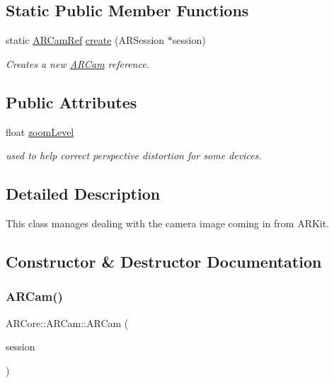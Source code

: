 \subsection*{Static Public Member Functions}
\begin{DoxyCompactItemize}
\item 
static \mbox{\hyperlink{namespace_a_r_core_a4ebe9e23907235fcf76bf65440fde0e0}{A\+R\+Cam\+Ref}} \mbox{\hyperlink{class_a_r_core_1_1_a_r_cam_ad4a6c0ebf786ea4e745cc8e95790681a}{create}} (A\+R\+Session $\ast$session)
\begin{DoxyCompactList}\small\item\em Creates a new \mbox{\hyperlink{class_a_r_core_1_1_a_r_cam}{A\+R\+Cam}} reference. \end{DoxyCompactList}\end{DoxyCompactItemize}
\subsection*{Public Attributes}
\begin{DoxyCompactItemize}
\item 
float \mbox{\hyperlink{class_a_r_core_1_1_a_r_cam_ac17d3b7fd12f51b2c54b7241efd36cd4}{zoom\+Level}}
\begin{DoxyCompactList}\small\item\em used to help correct perspective distortion for some devices. \end{DoxyCompactList}\end{DoxyCompactItemize}


\subsection{Detailed Description}
This class manages dealing with the camera image coming in from A\+R\+Kit. 

\subsection{Constructor \& Destructor Documentation}
\mbox{\label{class_a_r_core_1_1_a_r_cam_aac3da0758960b1cc5787eae0b7efffe1}} 
\subsubsection{\texorpdfstring{A\+R\+Cam()}{ARCam()}}
{\footnotesize\ttfamily A\+R\+Core\+::\+A\+R\+Cam\+::\+A\+R\+Cam (\begin{DoxyParamCaption}\item[{A\+R\+Session $\ast$}]{session }\end{DoxyParamCaption})}



